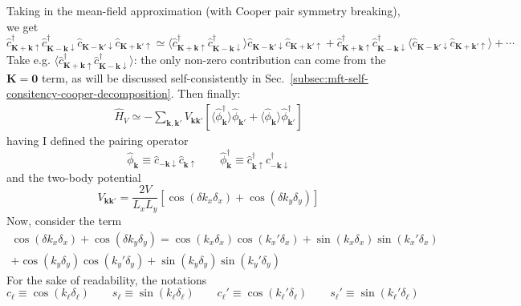 Taking in the mean-field approximation (with Cooper pair symmetry breaking), we get
\[
	\hat c_{\mathbf{K}+\mathbf{k} \uparrow}^\dagger \hat c_{\mathbf{K}-\mathbf{k} \downarrow}^\dagger \hat c_{\mathbf{K}-\mathbf{k}' \downarrow} \hat c_{\mathbf{K}+\mathbf{k}'\uparrow} \simeq \langle
		\hat c_{\mathbf{K}+\mathbf{k} \uparrow}^\dagger \hat c_{\mathbf{K}-\mathbf{k} \downarrow}^\dagger
	\rangle \hat c_{\mathbf{K}-\mathbf{k}' \downarrow} \hat c_{\mathbf{K}+\mathbf{k}'\uparrow} + \hat c_{\mathbf{K}+\mathbf{k} \uparrow}^\dagger \hat c_{\mathbf{K}-\mathbf{k} \downarrow}^\dagger \langle 
		\hat c_{\mathbf{K}-\mathbf{k}' \downarrow} \hat c_{\mathbf{K}+\mathbf{k}'\uparrow}
	\rangle + \cdots
\]
Take e.g. $\langle \hat c_{\mathbf{K}+\mathbf{k} \uparrow}^\dagger \hat c_{\mathbf{K}-\mathbf{k} \downarrow}^\dagger \rangle$: the only non-zero contribution can come from the $\mathbf{K}=\mathbf{0}$ term, as will be discussed self-consistently in Sec.~\ref{subsec:mft-self-consitency-cooper-decomposition}. Then finally:
\[
\begin{aligned}
	\hat H_V \simeq - \sum_{\mathbf{k}, \mathbf{k}'}
	V_{\mathbf{k}\mathbf{k}'} \left[
		\langle 
			\hat \phi_\mathbf{k}^\dagger
		\rangle \hat \phi_{\mathbf{k}'} + \langle 
			\hat \phi_\mathbf{k}
		\rangle \hat \phi_{\mathbf{k}'}^\dagger
	\right]	
\end{aligned}
\]
having I defined the pairing operator 
\[
	\hat \phi_\mathbf{k} \equiv \hat c_{-\mathbf{k}\downarrow} \hat c_{\mathbf{k} \uparrow}
	\qquad
	\hat \phi_\mathbf{k}^\dagger \equiv \hat c_{\mathbf{k} \uparrow}^\dagger \hat c_{-\mathbf{k}\downarrow}^\dagger
\]
and the two-body potential
\[
	V_{\mathbf{k}\mathbf{k}'} = \frac{2V}{L_x L_y} \left[
		\cos \left(
			\delta k_x \delta_x
			\right)	+ \cos \left(
			\delta k_y \delta_y
		\right)	
	\right]
\]
Now, consider the term
\begin{multline*}
	\cos \left( \delta k_x \delta_x \right)	+ \cos \left( \delta k_y \delta_y \right) = \cos \left( k_x \delta_x \right) \cos \left( k_x' \delta_x \right) + \sin \left( 
		k_x \delta_x \right) \sin \left( k_x' \delta_x
	\right) \\ 
	+ \cos \left(
		k_y \delta_y \right) \cos \left( k_y' \delta_y
	\right) + \sin \left( 
		k_y \delta_y 
	\right) \sin \left( 
		k_y' \delta_y
	\right)
\end{multline*}
For the sake of readability, the notations
\[
	c_\ell \equiv \cos\left(
		k_\ell \delta_\ell
	\right)
	\qquad
	s_\ell \equiv \sin \left(
		k_\ell \delta_\ell
	\right)
	\qquad
	c_\ell' \equiv \cos\left(
		k_\ell' \delta_\ell
	\right)
	\qquad
	s_\ell' \equiv \sin \left(
		k_\ell' \delta_\ell
	\right)
\]
